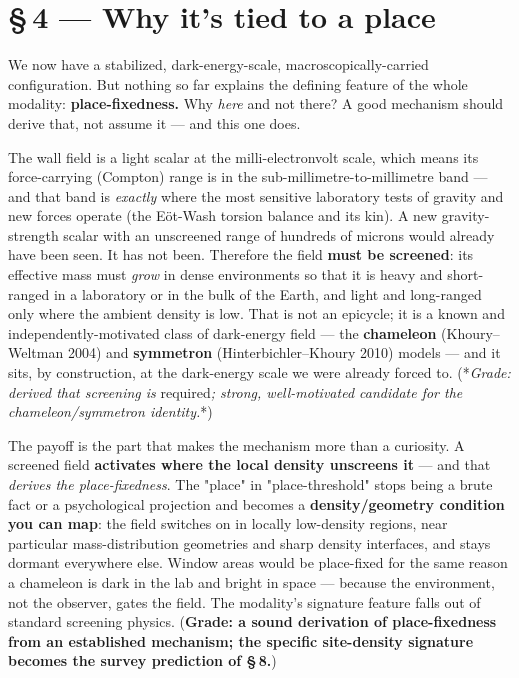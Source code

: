 \documentclass[11pt]{article}
\begin{document}
\section*{\S\,4 --- Why it's tied to a place}
We now have a stabilized, dark-energy-scale, macroscopically-carried configuration. But nothing so far explains the defining feature of the whole modality: \textbf{place-fixedness.} Why \emph{here} and not there? A good mechanism should derive that, not assume it --- and this one does.

The wall field is a light scalar at the milli-electronvolt scale, which means its force-carrying (Compton) range is in the sub-millimetre-to-millimetre band --- and that band is \emph{exactly} where the most sensitive laboratory tests of gravity and new forces operate (the Eöt-Wash torsion balance and its kin). A new gravity-strength scalar with an unscreened range of hundreds of microns would already have been seen. It has not been. Therefore the field \textbf{must be screened}: its effective mass must \emph{grow} in dense environments so that it is heavy and short-ranged in a laboratory or in the bulk of the Earth, and light and long-ranged only where the ambient density is low. That is not an epicycle; it is a known and independently-motivated class of dark-energy field --- the \textbf{chameleon} (Khoury--Weltman 2004) and \textbf{symmetron} (Hinterbichler--Khoury 2010) models --- and it sits, by construction, at the dark-energy scale we were already forced to. (*\emph{Grade: derived that screening is }required\emph{; strong, well-motivated candidate for the chameleon/symmetron identity.}*)

The payoff is the part that makes the mechanism more than a curiosity. A screened field \textbf{activates where the local density unscreens it} --- and that \emph{derives the place-fixedness}. The "place" in "place-threshold" stops being a brute fact or a psychological projection and becomes a \textbf{density/geometry condition you can map}: the field switches on in locally low-density regions, near particular mass-distribution geometries and sharp density interfaces, and stays dormant everywhere else. Window areas would be place-fixed for the same reason a chameleon is dark in the lab and bright in space --- because the environment, not the observer, gates the field. The modality's signature feature falls out of standard screening physics. (\textbf{Grade: a sound derivation of place-fixedness from an established mechanism; the specific site-density signature becomes the survey prediction of \S\,8.})
\end{document}
